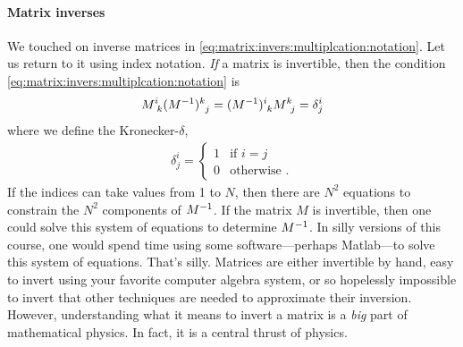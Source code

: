 \paragraph{Matrix inverses}
We touched on inverse matrices in \eqref{eq:matrix:invers:multiplcation:notation}. Let us return to it using index notation. \emph{If} a matrix is invertible, then the condition \eqref{eq:matrix:invers:multiplcation:notation} is
\begin{align}
    M\aij{i}{k}(M\inv)\aij{k}{j} = (M\inv)\aij{i}{k}M\aij{k}{j} = \delta^i_j
    \label{eq:index:matrix:inverse}
\end{align}
where we define the Kronecker-$\delta$,
\begin{align}
    \delta^i_j = \begin{cases}
    1 & \text{if } i=j \\
    0 & \text{otherwise .}
    \end{cases}
    \label{eq:kronecker:delta}
\end{align}
If the indices can take values from 1 to $N$, then there are $N^2$ equations to constrain the $N^2$ components of $M^{-1}$. If the matrix $M$ is invertible, then one could solve this system of equations to determine $M^{-1}$. In silly versions of this course, one would spend time using some software---perhaps Matlab---to solve this system of equations. That's silly. Matrices are either invertible by hand, easy to invert using your favorite computer algebra system, or so hopelessly impossible to invert that other techniques are needed to approximate their inversion. However, understanding what it means to invert a matrix is a \emph{big} part of mathematical physics. In fact, it is a central thrust of physics.

